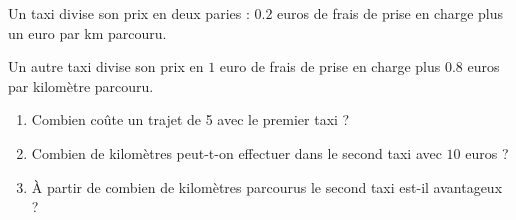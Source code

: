 
\begin{exercice}\label{exosmath-0086}

Un taxi divise son prix en deux paries : $0.2$ euros de frais de prise en charge plus un euro par km parcouru.

Un autre taxi divise son prix en $1$ euro de frais de prise en charge plus $0.8$ euros par kilomètre parcouru.

\begin{enumerate}
    \item
        Combien coûte un trajet de \unit{5}{\kilo\meter} avec le premier taxi ?
    \item
        Combien de kilomètres peut-t-on effectuer dans le second taxi avec \( 10\) euros ?
    \item
        À partir de combien de kilomètres parcourus le second taxi est-il avantageux ?
\end{enumerate}

\end{exercice}
